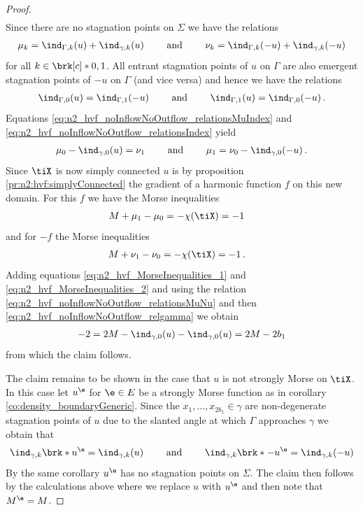 \begin{proof}
\begin{align}
  \end{align}
  Since there are no stagnation points on $\Sigma$ we have the relations
  \begin{align}
    \mu_k=\ind_{\Gamma,k}(u)+\ind_{\gamma,k}(u) \qquad\text{ and }\qquad
    \nu_k=\ind_{\Gamma,k}(-u)+\ind_{\gamma,k}(-u)\label{eq:n2_hvf_noInflowNoOutflow_relationsMuIndex}
  \end{align}
  for all $k\in\brk[c]*{0,1}$.
  All entrant stagnation points of $u$ on $\Gamma$ are also emergent
  stagnation points of $-u$ on $\Gamma$ (and vice versa) and hence we have the relations
  \begin{align}
    \ind_{\Gamma,0}(u)=\ind_{\Gamma,1}(-u) \qquad\text{ and }\qquad
    \ind_{\Gamma,1}(u)=\ind_{\Gamma,0}(-u)\,.\label{eq:n2_hvf_noInflowNoOutflow_relationsIndex}
  \end{align}
  Equations \eqref{eq:n2_hvf_noInflowNoOutflow_relationsMuIndex} and \eqref{eq:n2_hvf_noInflowNoOutflow_relationsIndex}
  yield 
  \begin{align}
    \mu_0-\ind_{\gamma,0}(u)=\nu_1 \qquad\text{ and }\qquad
    \mu_1=\nu_0-\ind_{\gamma,0}(-u)\,.\label{eq:n2_hvf_noInflowNoOutflow_relationsMuNu}
  \end{align}
  Since $\tiX$ is now simply connected $u$ is 
  by proposition \ref{pr:n2:hvf:simplyConnected}
  the gradient of a harmonic function $f$ on this new domain.
  For this $f$ we have the Morse inequalities
  \begin{align}
    M+\mu_1-\mu_0&=-\chi(\tiX)=-1 \label{eq:n2_hvf_MorseInequalities_1}
  \end{align}
  and for $-f$ the Morse inequalities
  \begin{align}
    M+\nu_1-\nu_0&=-\chi(\tiX)=-1\,. \label{eq:n2_hvf_MorseInequalities_2}
  \end{align}
  Adding equations \eqref{eq:n2_hvf_MorseInequalities_1} and \eqref{eq:n2_hvf_MorseInequalities_2} and using the relation
  \eqref{eq:n2_hvf_noInflowNoOutflow_relationsMuNu} and then \eqref{eq:n2_hvf_noInflowNoOutflow_relgamma} we obtain
  \begin{align*}
    -2=2M-\ind_{\gamma,0}(u)-\ind_{\gamma,0}(u)
    =2M-2b_1
  \end{align*}
  from which the claim follows.

  The claim remains to be shown in the case that $u$ is not strongly Morse on $\tiX$. In this case let
  $u^\e$ for $\e\in E$ be a strongly Morse function as in corollary \ref{co:density_boundaryGeneric}.
  Since the $x_1,\dots,x_{2b_1}\in\gamma$ are non-degenerate stagnation points of $u$
  due to the slanted angle at which
  $\Gamma$ approaches $\gamma$
  we obtain that
  \begin{align}
    \ind_{\gamma,k}\brk*{u^\e}=\ind_{\gamma,k}(u)\qquad\text{ and }\qquad 
    \ind_{\gamma,k}\brk*{-u^\e}=\ind_{\gamma,k}(-u)
    \label{eq:n3_disproof_morse_indexApprox}
  \end{align}
  By the same corollary $u^\e$ has no stagnation points on $\Sigma$.
  The claim then follows by the calculations above where we replace
  $u$ with $u^\e$ and then note that $M^\e=M$.
\end{proof}
